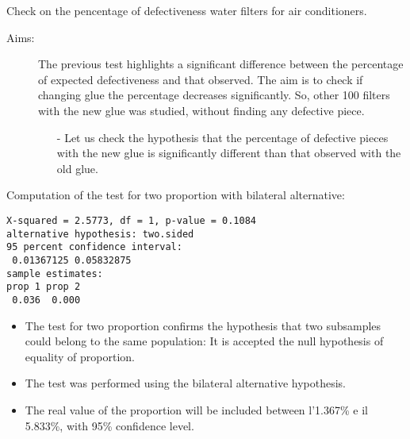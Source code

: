 
\begin{frame} 
   Check on the pencentage of defectiveness water filters for air conditioners.
  \begin{description}
    \item[Aims:]
      \begin{small}
        The previous test highlights a significant difference between the percentage of expected defectiveness and that observed. The aim is to check if changing glue the percentage decreases significantly. So, other 100 filters with the new glue was studied, without finding any defective piece.  
        \begin{itemize}
          \item[-] Let us check the hypothesis that the percentage of defective pieces with the new glue is significantly different than that observed with the old glue.
        \end{itemize}
      \end{small}
  \end{description}
\end{frame}

\begin{frame}[fragile]
Computation of the test for two proportion with bilateral alternative:\\
  \begin{verbatim}
X-squared = 2.5773, df = 1, p-value = 0.1084
alternative hypothesis: two.sided
95 percent confidence interval:
 0.01367125 0.05832875
sample estimates:
prop 1 prop 2
 0.036  0.000
  \end{verbatim}
\end{frame}

\begin{frame}
  \begin{itemize}
    \item The test for two proportion confirms the hypothesis that two subsamples could belong to the same population: It is accepted the null hypothesis of equality of proportion. 
    \vspace{0.75cm}
    \item The test was performed using the bilateral alternative hypothesis.
    \vspace{0.75cm}
    \item The real value of the proportion will be included between l'1.367\% e il 5.833\%, with 95\% confidence level.
  \end{itemize}
\end{frame}

